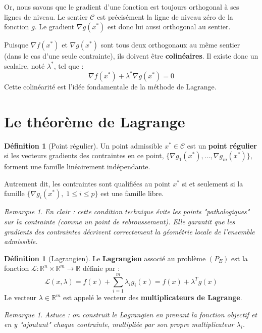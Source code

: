 \documentclass[a4paper,12pt,openany]{book}
\theoremstyle{plain}
\theoremstyle{definition}
\newtheorem{definition}[theorem]{Définition}
\theoremstyle{remark}
\newtheorem{remark}[theorem]{Remarque}
\theoremstyle{nbstyle}
\newcommand{\R}{\mathbb{R}}
\newcommand{\grad}{\nabla}
\newcommand{\T}{^T}
\begin{document}
	Or, nous savons que le gradient d'une fonction est toujours orthogonal à ses lignes de niveau. Le sentier $\mathcal{C}$ est précisément la ligne de niveau zéro de la fonction $g$. Le gradient $\grad g(x^*)$ est donc lui aussi orthogonal au sentier.
	
	Puisque $\grad f(x^*)$ et $\grad g(x^*)$ sont tous deux orthogonaux au même sentier (dans le cas d'une seule contrainte), ils doivent être \textbf{colinéaires}. Il existe donc un scalaire, noté $\lambda^*$, tel que :
	$$\grad f(x^*) + \lambda^* \grad g(x^*) = 0$$
	Cette colinéarité est l'idée fondamentale de la méthode de Lagrange.
	
	\section{Le théorème de Lagrange}
	
	\begin{definition}[Point régulier]
		Un point admissible $x^* \in \mathcal{C}$ est un \textbf{point régulier} si les vecteurs gradients des contraintes en ce point, $\{\grad g_1(x^*), \dots, \grad g_m(x^*)\}$, forment une famille linéairement indépendante.
	\end{definition}
	
	Autrement dit, les contraintes sont qualifiées au point \(x^*\) si et seulement si la famille
	\(\{\nabla g_i(x^*) ,\;1\le i\le p\}\) est une famille libre.
	
	\begin{remark}
		\textit{En clair : cette condition technique évite les points "pathologiques" sur la contrainte (comme un point de rebroussement). Elle garantit que les gradients des contraintes décrivent correctement la géométrie locale de l'ensemble admissible.}
	\end{remark}
	
	\begin{definition}[Lagrangien]
		Le \textbf{Lagrangien} associé au problème $(P_E)$ est la fonction $\mathcal{L}: \R^n \times \R^m \to \R$ définie par :
		$$\mathcal{L}(x, \lambda) = f(x) + \sum_{i=1}^m \lambda_i g_i(x) = f(x) + \lambda\T g(x)$$
		Le vecteur $\lambda \in \R^m$ est appelé le vecteur des \textbf{multiplicateurs de Lagrange}.
	\end{definition}
	\begin{remark}
		\textit{Astuce : on construit le Lagrangien en prenant la fonction objectif et en y "ajoutant" chaque contrainte, multipliée par son propre multiplicateur $\lambda_i$.}
	\end{remark}
	
\end{document}

